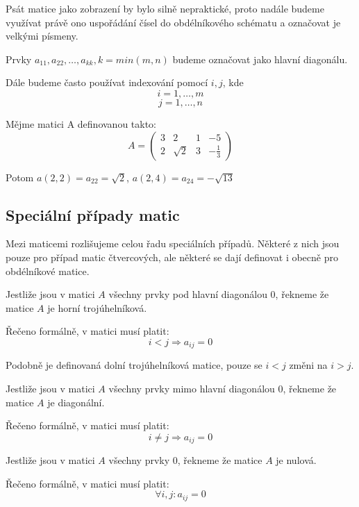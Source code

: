 Psát matice jako zobrazení by bylo silně nepraktické, proto nadále budeme využívat
právě ono uspořádání čísel do obdélníkového schématu a označovat je velkými písmeny.

Prvky $a_{11}, a_{22}, \ldots, a_{kk}, k = min(m, n)$ budeme označovat jako hlavní
diagonálu.

Dále budeme často používat indexování pomocí $i, j$, kde
$$i = 1, \ldots, m$$
$$j = 1, \ldots, n$$

\begin{example}[Matice]

    Mějme matici A definovanou takto:
    $$ A = \begin{pmatrix}
        3 & 2 & 1 & -5 \\
        2 & \sqrt{2} & 3 & -\frac{1}{3}
        \end{pmatrix}  $$

    Potom $a(2, 2) = a_{22} = \sqrt{2}$, $a(2, 4) = a_{24} = -\sqrt{13}$
\end{example}

\subsection{Speciální případy matic}
Mezi maticemi rozlišujeme celou řadu speciálních případů. Některé z nich jsou pouze
pro případ matic čtvercových, ale některé se dají definovat i obecně pro obdélníkové matice.

\begin{definition}
    Jestliže jsou v matici $A$ všechny prvky pod hlavní diagonálou 0,
    řekneme že matice $A$ je horní trojúhelníková.

    Řečeno formálně, v matici musí platit:
    $$i < j \Rightarrow a_{ij} = 0$$

    Podobně je definovaná dolní trojúhelníková matice, pouze se $i < j$ změni na $i > j$.
\end{definition}

\begin{definition}
    Jestliže jsou v matici $A$ všechny prvky mimo hlavní diagonálou 0,
    řekneme že matice $A$ je diagonální.

    Řečeno formálně, v matici musí platit:
    $$i \neq j \Rightarrow a_{ij} = 0$$
\end{definition}

\begin{definition}
    Jestliže jsou v matici $A$ všechny prvky 0,
    řekneme že matice $A$ je nulová.

    Řečeno formálně, v matici musí platit:
    $$\forall i,j: a_{ij} = 0$$
\end{definition}

